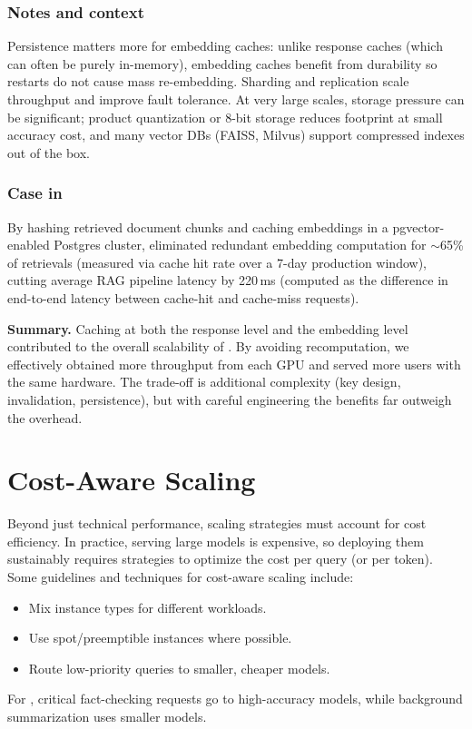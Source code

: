 \subsubsection{Notes and context}
Persistence matters more for embedding caches: unlike response caches (which can often be purely in-memory), embedding caches benefit from durability so restarts do not cause mass re-embedding. Sharding and replication scale throughput and improve fault tolerance. At very large scales, storage pressure can be significant; product quantization or 8-bit storage reduces footprint at small accuracy cost, and many vector DBs (FAISS, Milvus) support compressed indexes out of the box.

\subsubsection{Case in \ishtar{}}
By hashing retrieved document chunks and caching embeddings in a pgvector-enabled Postgres cluster, \ishtar{} eliminated redundant embedding computation for $\sim$65\% of retrievals (measured via cache hit rate over a 7-day production window), cutting average RAG pipeline latency by 220\,ms (computed as the difference in end-to-end latency between cache-hit and cache-miss requests).

\medskip
\noindent\textbf{Summary.} Caching at both the response level and the embedding level contributed to the overall scalability of \ishtar{}. By avoiding recomputation, we effectively obtained more throughput from each GPU and served more users with the same hardware. The trade-off is additional complexity (key design, invalidation, persistence), but with careful engineering the benefits far outweigh the overhead.


\section{Cost-Aware Scaling}
\label{sec:cost-aware-scaling}
Beyond just technical performance, scaling strategies must account for cost efficiency. In practice, serving large models is expensive, so deploying them sustainably requires strategies to optimize the cost per query (or per token). Some guidelines and techniques for cost-aware scaling include:

\begin{itemize}
    \item Mix instance types for different workloads.
    \item Use spot/preemptible instances where possible.
    \item Route low-priority queries to smaller, cheaper models.
\end{itemize}
For \ishtar{}, critical fact-checking requests go to high-accuracy models, while background summarization uses smaller models.


